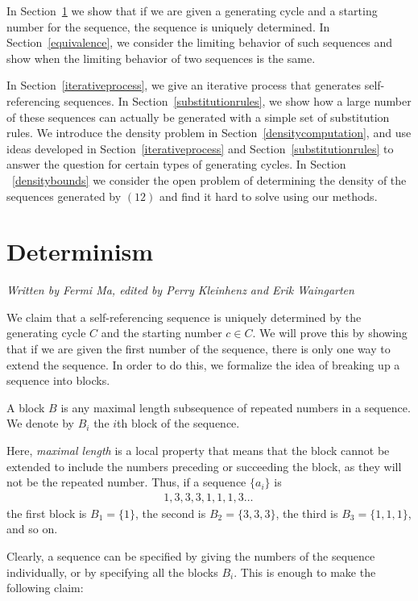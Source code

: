 \documentclass[runningheads,a4paper]{llncs}
\begin{document}
In Section~\ref{determinism} we show that if we are given a generating cycle and a starting number for the sequence, the sequence is uniquely determined. In Section~\ref{equivalence}, we consider the limiting behavior of such sequences and show when the limiting behavior of two sequences is the same. 

In Section~\ref{iterativeprocess}, we give an iterative process that generates self-referencing sequences. In Section~\ref{substitutionrules}, we show how a large number of these sequences can actually be generated with a simple set of substitution rules. We introduce the density problem in Section~\ref{densitycomputation}, and use ideas developed in Section~\ref{iterativeprocess} and Section~\ref{substitutionrules} to answer the question for certain types of generating cycles. In Section ~\ref{densitybounds}  we consider the open problem of determining the density of the sequences generated by $(12)$ and find it hard to solve using our methods.

\section{Determinism}
\label{determinism}

\emph{Written by Fermi Ma, edited by Perry Kleinhenz and Erik Waingarten}

We claim that a self-referencing sequence is uniquely determined by the generating cycle $C$ and the starting number $c \in C$. We will prove this by showing that if we are given the first number of the sequence, there is only one way to extend the sequence. In order to do this, we formalize the idea of breaking up a sequence into blocks.

\begin{definition}
A block $B$ is any maximal length subsequence of repeated numbers in a sequence. We denote by $B_i$ the $i$th block of the sequence.
\end{definition}

Here, \emph{maximal length} is a local property that means that the block cannot be extended to include the numbers preceding or succeeding the block, as they will not be the repeated number. Thus, if a sequence $\{a_i\}$ is
\begin{align*}
1,3,3,3,1,1,1,3\dots \,
\end{align*}
the first block is $B_1 = \{1\}$, the second is $B_2 = \{3,3,3\}$, the third is $B_3 = \{1,1,1\}$, and so on. 

Clearly, a sequence can be specified by giving the numbers of the sequence individually, or by specifying all the blocks $B_i$. This is enough to make the following claim:
\end{document}
